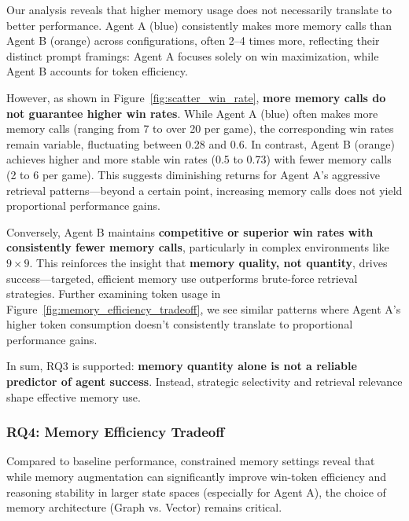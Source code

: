 \documentclass[10pt]{article}
\begin{document}
Our analysis reveals that higher memory usage does not necessarily translate to better performance. Agent A (blue) consistently makes more memory calls than Agent B (orange) across configurations, often 2–4 times more, reflecting their distinct prompt framings: Agent A focuses solely on win maximization, while Agent B accounts for token efficiency.

However, as shown in Figure~\ref{fig:scatter_win_rate}, \textbf{more memory calls do not guarantee higher win rates}. While Agent A (blue) often makes more memory calls (ranging from 7 to over 20 per game), the corresponding win rates remain variable, fluctuating between 0.28 and 0.6. In contrast, Agent B (orange) achieves higher and more stable win rates (0.5 to 0.73) with fewer memory calls (2 to 6 per game). This suggests diminishing returns for Agent A's aggressive retrieval patterns—beyond a certain point, increasing memory calls does not yield proportional performance gains.

Conversely, Agent B maintains \textbf{competitive or superior win rates with consistently fewer memory calls}, particularly in complex environments like $9\times9$. This reinforces the insight that \textbf{memory quality, not quantity}, drives success—targeted, efficient memory use outperforms brute-force retrieval strategies. Further examining token usage in Figure~\ref{fig:memory_efficiency_tradeoff}, we see similar patterns where Agent A's higher token consumption doesn't consistently translate to proportional performance gains.

In sum, RQ3 is supported: \textbf{memory quantity alone is not a reliable predictor of agent success}. Instead, strategic selectivity and retrieval relevance shape effective memory use.

\subsubsection{RQ4: Memory Efficiency Tradeoff}

Compared to baseline performance, constrained memory settings reveal that while memory augmentation can significantly improve win-token efficiency and reasoning stability in larger state spaces (especially for Agent A), the choice of memory architecture (Graph vs. Vector) remains critical.
\end{document}
